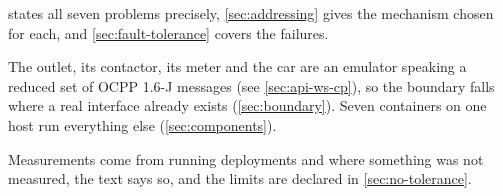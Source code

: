  states all seven problems precisely, \cref{sec:addressing} gives the
mechanism chosen for each, and \cref{sec:fault-tolerance} covers the failures.

The outlet, its contactor, its meter
and the car are an emulator speaking a reduced set of OCPP 1.6-J messages (see \cref{sec:api-ws-cp}), so the boundary
falls where a real interface already exists (\cref{sec:boundary}). Seven containers on one
host run everything else (\cref{sec:components}).

Measurements come from running deployments and where something was not measured, the text says so,
and the limits are declared in \cref{sec:no-tolerance}.
